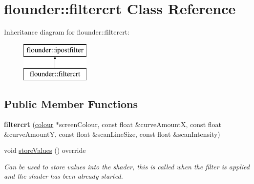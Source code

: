 \hypertarget{classflounder_1_1filtercrt}{}\section{flounder\+:\+:filtercrt Class Reference}
\label{classflounder_1_1filtercrt}
Inheritance diagram for flounder\+:\+:filtercrt\+:\begin{figure}[H]
\begin{center}
\leavevmode
\includegraphics[height=2.000000cm]{classflounder_1_1filtercrt}
\end{center}
\end{figure}
\subsection*{Public Member Functions}
\begin{DoxyCompactItemize}
\item 
\mbox{\label{classflounder_1_1filtercrt_aeceb7db9c18f0e13242fa1895b142e59}} 
{\bfseries filtercrt} (\hyperlink{classflounder_1_1colour}{colour} $\ast$screen\+Colour, const float \&curve\+AmountX, const float \&curve\+AmountY, const float \&scan\+Line\+Size, const float \&scan\+Intensity)
\item 
void \hyperlink{classflounder_1_1filtercrt_a6b3d151d6e338a7c859aeea1016724dc}{store\+Values} () override
\begin{DoxyCompactList}\small\item\em Can be used to store values into the shader, this is called when the filter is applied and the shader has been already started. \end{DoxyCompactList}\end{DoxyCompactItemize}
